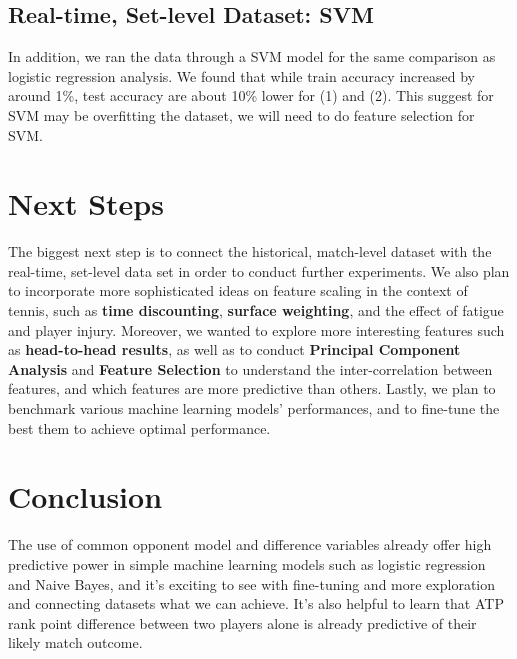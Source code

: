 \documentclass[paper=a4, fontsize=11pt]{scrartcl} %
\numberwithin{equation}{section} %
\numberwithin{figure}{section} %
\numberwithin{table}{section} %
\begin{document}
\subsection{Real-time, Set-level Dataset:  SVM}
In addition, we ran the data through a SVM model for the same comparison as logistic regression analysis.  We found that while train accuracy increased by around 1\%, test accuracy are about 10\%  lower for (1) and (2).  This suggest for SVM may be overfitting the dataset, we will need to do feature selection for SVM.


\section{Next Steps}
The biggest next step is to connect the historical, match-level dataset with the real-time, set-level data set in order to conduct further experiments. We also plan to incorporate more sophisticated ideas on feature scaling in the context of tennis, such as \textbf{time discounting}, \textbf{surface weighting}, and the effect of fatigue and player injury. Moreover, we wanted to explore more interesting features such as \textbf{head-to-head results}, as well as to conduct \textbf{Principal Component Analysis} and \textbf{Feature Selection} to understand the inter-correlation between features, and which features are more predictive than others. Lastly, we plan to benchmark various machine learning models' performances, and to fine-tune the best them to achieve optimal performance. 
\section{Conclusion}
The use of common opponent model and difference variables already offer high predictive power in simple machine learning models such as logistic regression and Naive Bayes, and it's exciting to see with fine-tuning and more exploration and connecting datasets what we can achieve. It's also helpful to learn that ATP rank point difference between two players alone is already predictive of their likely match outcome. 
\end{document}
